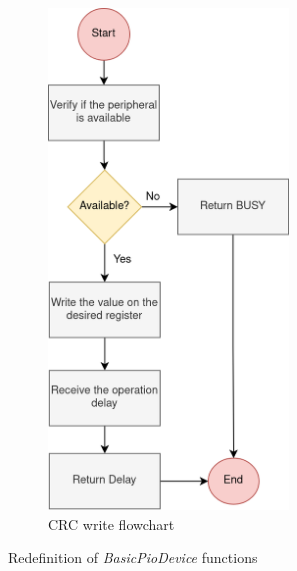 \begin{figure}[t!]
\begin{subfigure}{0.4\textwidth}
		\includegraphics[width=0.7\textwidth]{Images/CrcWriteFunction.png}
		\caption[1\textwidth]{CRC write flowchart}
		\label{fig_CrcWriteFunction}
	\end{subfigure}
		
	\caption{Redefinition of \textit{BasicPioDevice} functions}
	\label{fig_Gem5ReadWrite}
\end{figure}
 
